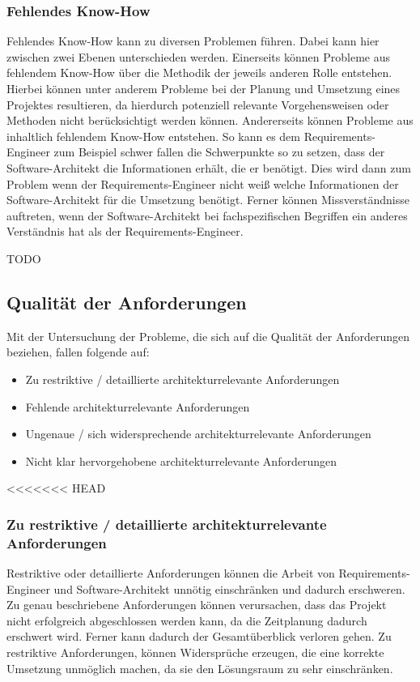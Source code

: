 \subsubsection{Fehlendes Know-How}
Fehlendes Know-How kann zu diversen Problemen führen. Dabei kann hier zwischen zwei Ebenen unterschieden werden. Einerseits können Probleme aus fehlendem Know-How über die Methodik der jeweils anderen Rolle entstehen. Hierbei können unter anderem Probleme bei der Planung und Umsetzung eines Projektes resultieren, da hierdurch potenziell relevante Vorgehensweisen oder Methoden nicht berücksichtigt werden können. Andererseits können Probleme aus inhaltlich fehlendem Know-How entstehen. So kann es dem Requirements-Engineer zum Beispiel schwer fallen die Schwerpunkte so zu setzen, dass der Software-Architekt die Informationen erhält, die er benötigt. Dies wird dann zum Problem wenn der Requirements-Engineer nicht weiß welche Informationen der Software-Architekt für die Umsetzung benötigt. Ferner können Missverständnisse auftreten, wenn der Software-Architekt bei fachspezifischen Begriffen ein anderes Verständnis hat als der Requirements-Engineer. 

TODO \\

\subsection{Qualit\"at der Anforderungen}

Mit der Untersuchung der Probleme, die sich auf die Qualität der Anforderungen beziehen, fallen folgende auf:
\begin{itemize}
\item Zu restriktive / detaillierte architekturrelevante Anforderungen
\item Fehlende architekturrelevante Anforderungen
\item Ungenaue / sich widersprechende architekturrelevante Anforderungen
\item Nicht klar hervorgehobene architekturrelevante Anforderungen\\
\end{itemize}

<<<<<<< HEAD
\subsubsection{Zu restriktive / detaillierte architekturrelevante Anforderungen}
Restriktive oder detaillierte Anforderungen können die Arbeit von Requirements-Engineer und Software-Architekt unnötig einschränken und dadurch erschweren. Zu genau beschriebene Anforderungen können verursachen, dass das Projekt nicht erfolgreich abgeschlossen werden kann, da die Zeitplanung dadurch erschwert wird. Ferner kann dadurch der Gesamtüberblick verloren gehen. Zu restriktive Anforderungen, können Widersprüche erzeugen, die eine korrekte Umsetzung unmöglich machen, da sie den Lösungsraum zu sehr einschränken. 

